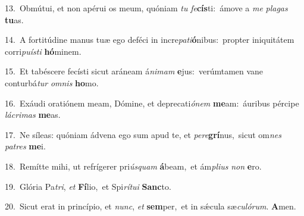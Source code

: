 {\numbfont\textcolor{\numbcolor}{13.}}~Obmútui, et non apérui os meum, quóniam \textit{tu} \textit{fe}\-\textbf{cís}ti:~\star ámove a \textit{me} \textit{pla}\-\textit{gas} \textbf{tu}\-as.\par
{\numbfont\textcolor{\numbcolor}{14.}}~A fortitúdine manus tuæ ego deféci in incre\-\textit{pa}\-\textit{ti}\textbf{ó}nibus:~\star propter iniquitátem corri\-\textit{pu}\-\textit{ís}\textit{ti} \textbf{hó}\-minem.\par
{\numbfont\textcolor{\numbcolor}{15.}}~Et tabéscere fecísti sicut aráneam á\-\textit{ni}\-\textit{mam} \textbf{e}\-jus:~\star verúmtamen vane conturbá\textit{tur} \textit{om}\-\textit{nis} \textbf{ho}\-mo.\par
{\numbfont\textcolor{\numbcolor}{16.}}~Exáudi oratiónem meam, Dómine, et deprecati\-\textit{ó}\-\textit{nem} \textbf{me}\-am:~\star áuribus pércipe \textit{lá}\-\textit{cri}\textit{mas} \textbf{me}\-as.\par
{\numbfont\textcolor{\numbcolor}{17.}}~Ne síleas: quóniam ádvena ego sum apud te, et \textit{per}\-\textit{e}\textbf{grí}nus,~\star sicut om\textit{nes} \textit{pa}\-\textit{tres} \textbf{me}\-i.\par
{\numbfont\textcolor{\numbcolor}{18.}}~Remítte mihi, ut refrígerer pri\-\textit{ús}\-\textit{quam} \textbf{á}\-beam,~\star et ám\-\textit{pli}\-\textit{us} \textit{non} \textbf{e}\-ro.\par
{\numbfont\textcolor{\numbcolor}{19.}}~Glória Pa\-\textit{tri}\-, \textit{et} \textbf{Fí}\-lio,~\star et Spi\-\textit{rí}\-\textit{tu}\textit{i} \textbf{Sanc}\-to.\par
{\numbfont\textcolor{\numbcolor}{20.}}~Sicut erat in princípio, et \textit{nunc}\-, \textit{et} \textbf{sem}\-per,~\star et in sǽcula sæ\-\textit{cu}\-\textit{ló}\textit{rum}. \textbf{A}\-men.\par
